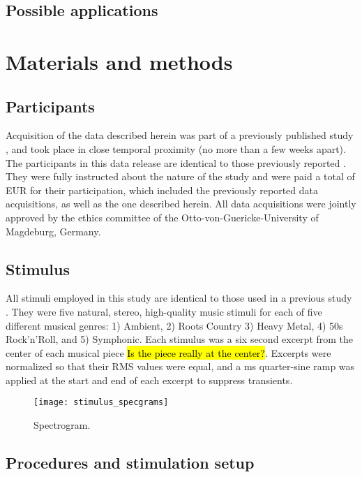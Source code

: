 \subsection*{Possible applications}

\section*{Materials and methods}
\subsection*{Participants}

Acquisition of the data described herein was part of a previously published
study \cite{HBI+14}, and took place in close temporal proximity (no more
than a few weeks apart). The participants in this data release are identical to
those previously reported \cite{HBI+14}.  They were fully instructed about
the nature of the study and were paid a total of \unit[100]{EUR} for their
participation, which included the previously reported data acquisitions, as
well as the one described herein. All data acquisitions were jointly approved
by the ethics committee of the Otto-von-Guericke-University of Magdeburg,
Germany.


\subsection*{Stimulus}

All stimuli employed in this study are identical to those used in a previous
study \cite[for details refer to][]{CTK+2012}. They were five natural,
stereo, high-quality music stimuli for each of five different musical genres:
1) Ambient, 2) Roots Country 3) Heavy Metal, 4) 50s Rock'n'Roll, and 5)
Symphonic.  Each stimulus was a six second excerpt from the center of each
musical piece \hl{Is the piece really at the center?}.  Excerpts were normalized so that their RMS values were equal,
and a \unit[50]{ms} quarter-sine ramp was applied at the start and end of each excerpt
to suppress transients.


\begin{figure*}
  \centering
  \texttt{[image: stimulus\_specgrams]}\\
  \caption{Spectrogram.}
  \label{fig:spectrograms}
\end{figure*}


\subsection*{Procedures and stimulation setup}


